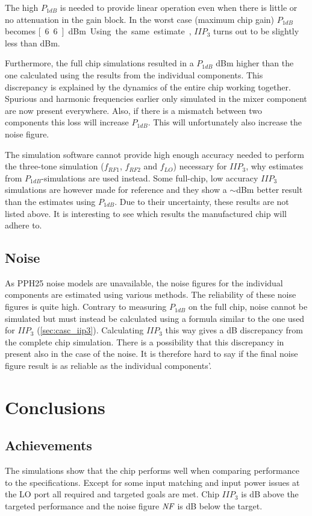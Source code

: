 			The high $P_{1dB}$ is needed to provide linear operation even when there is little or no attenuation in the gain block. In the worst case (maximum chip gain) $P_{1dB}$ becomes \unit[6.6]{dBm}. Using the same estimate, $IIP_3$ turns out to be slightly less than \unit[17]{dBm}.
			
			Furthermore, the full chip simulations resulted in a $P_{1dB}$ \unit[2]{dBm} higher than the one calculated using the results from the individual components. This discrepancy is explained by the dynamics of the entire chip working together. Spurious and harmonic frequencies earlier only simulated in the mixer component are now present everywhere. Also, if there is a mismatch between two components this loss will increase $P_{1dB}$. This will unfortunately also increase the noise figure.
			
			The simulation software cannot provide high enough accuracy needed to perform the three-tone simulation ($f_{RF1}$, $f_{RF2}$ and $f_{LO}$) necessary for $IIP_3$, why estimates from $P_{1dB}$-simulations are used instead. Some full-chip, low accuracy $IIP_3$ simulations are however made for reference and they show a $\sim$\unit[3]{dBm} better result than the estimates using $P_{1dB}$. Due to their uncertainty, these results are not listed above. It is interesting to see which results the manufactured chip will adhere to.
			
		\subsection{Noise}
			As PPH25 noise models are unavailable, the noise figures for the individual components are estimated using various methods. The reliability of these noise figures is quite high. Contrary to measuring $P_{1dB}$ on the full chip, noise cannot be simulated but must instead be calculated using a formula similar to the one used for $IIP_3$ (\autoref{sec:casc_iip3}). Calculating $IIP_3$ this way gives a \unit[2]{dB} discrepancy from the complete chip simulation. There is a possibility that this discrepancy in present also in the case of the noise. It is therefore hard to say if the final noise figure result is as reliable as the individual components'.
			
	\section{Conclusions}
		\subsection{Achievements}
			The simulations show that the chip performs well when comparing performance to the specifications. Except for some input matching and input power issues at the LO port all required and targeted goals are met. Chip $IIP_3$ is \unit[3]{dB} above the targeted performance and the noise figure $\emph{NF}$ is \unit[1]{dB} below the target.
						
